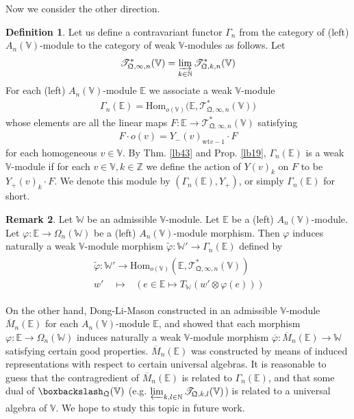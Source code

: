 \documentclass[11pt,b5paper,notitlepage]{article}
\theoremstyle{definition}
\newtheorem{df}{Definition}[section]
\newtheorem{rem}[df]{Remark}
\theoremstyle{plain}
\newcommand{\wtd}{\widetilde}
\newcommand{\ovl}{\overline}
\newcommand{\Hom}{\mathrm{Hom}}
\newcommand{\scr}{\mathscr}
\newcommand{\Vbb}{\mathbb V}
\newcommand{\Wbb}{\mathbb W}
\newcommand{\Nbb}{\mathbb N}
\newcommand{\Zbb}{\mathbb Z}
\newcommand{\Ebb}{\mathbb E}
\newcommand{\wt}{\mathrm{wt}}
\newcommand{\<}{\left\langle}
\renewcommand{\>}{\right\rangle}
\newcommand{\bbs}{\boxbackslash}
\newcommand{\fq}{{\mathfrak Q}}
\numberwithin{equation}{section}
\begin{document}
Now we consider the other direction. 
\begin{df}
Let us define a contravariant functor $\Gamma_n$ from the category of (left) $A_n(\Vbb)$-module to the category of weak $\Vbb$-modules as follows. Let
\begin{align*}
\scr T_{\fq,\infty,n}^*(\Vbb)=\varinjlim_{k\in\Nbb} \scr T_{\fq,k,n}^*(\Vbb)
\end{align*}
For each (left) $A_n(\Vbb)$-module $\Ebb$ we associate a weak $\Vbb$-module
\begin{align}
\Gamma_n(\Ebb)=\Hom_{o(\Vbb)}\big(\Ebb,\scr T_{\fq,\infty,n}^*(\Vbb)\big)
\end{align}
whose elements are all the linear maps $F:\Ebb\rightarrow\scr T_{\fq,\infty,n}^*(\Vbb)$ satisfying
\begin{align}
F \cdot o(v)=Y_-(v)_{\wt v-1}\cdot F
\end{align}
for each homogeneous $v\in\Vbb$. By Thm. \ref{lb43} and Prop. \ref{lb19}, $\Gamma_n(\Ebb)$ is a weak $\Vbb$-module if for each $v\in\Vbb,k\in\Zbb$ we define the action of $Y(v)_k$ on $F$ to be $Y_+(v)_k\cdot F$. We denote this module by $(\Gamma_n(\Ebb),Y_+)$, or simply $\Gamma_n(\Ebb)$ for short.
\end{df}

\begin{rem}
Let $\Wbb$ be an admissible $\Vbb$-module. Let $\Ebb$ be a (left) $A_n(\Vbb)$-module. Let $\varphi:\Ebb\rightarrow \Omega_n(\Wbb)$ be a (left) $A_n(\Vbb)$-module morphism. Then $\varphi$ induces naturally a weak $\Vbb$-module morphism $\wtd\varphi:\Wbb'\rightarrow\Gamma_n(\Ebb)$ defined by
\begin{gather}
\begin{gathered}
\wtd\varphi:\Wbb'\rightarrow \Hom_{o(\Vbb)}(\Ebb,\scr T_{\fq,\infty,n}^*(\Vbb))\\
w'\quad\mapsto\quad\big(~e\in\Ebb\mapsto T_\Wbb(w'\otimes \varphi(e))~\big)
\end{gathered}
\end{gather}

On the other hand, Dong-Li-Mason constructed in \cite{DLM-Zhu} an admissible $\Vbb$-module $\ovl M_n(\Ebb)$ for each $A_n(\Vbb)$-module $\Ebb$, and showed that each morphism $\varphi:\Ebb\rightarrow \Omega_n(\Wbb)$ induces naturally a weak $\Vbb$-module morphism $\ovl\varphi:\ovl M_n(\Ebb)\rightarrow\Wbb$ satisfying certain good properties. $\ovl M_n(\Ebb)$ was constructed by means of induced representations with respect to certain universal algebras. It is reasonable to guess that the contragredient of $\ovl M_n(\Ebb)$ is related to $\Gamma_n(\Ebb)$, and that some dual of $\bbs_\fq(\Vbb)$ (e.g. $\varprojlim_{k,l\in\Nbb}\scr T_{\fq,k,l}(\Vbb)$) is related to a universal algebra of $\Vbb$. We hope to study this topic in future work.
\end{rem}
\end{document}
